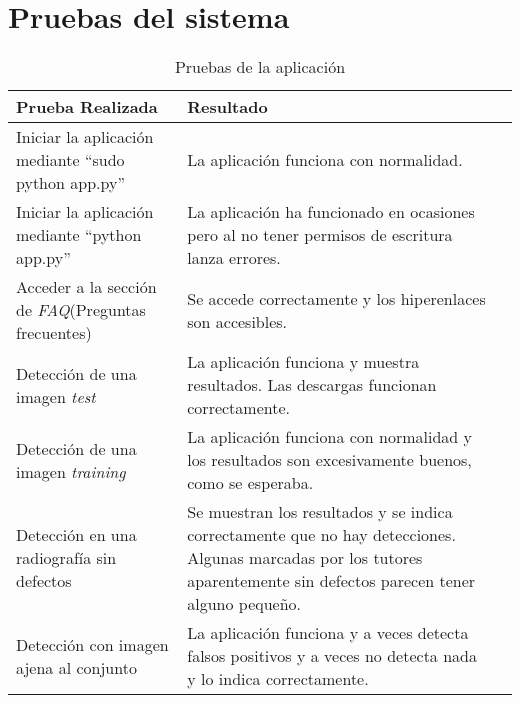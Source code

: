 \clearpage

\section{Pruebas del sistema}

\begin{table}[h]
	\begin{center}
		\begin{tabular}{>{\centering\arraybackslash}m{5cm} >{\centering\arraybackslash}m{5cm} p{9cm}}
		    \hline
			\textbf{Prueba Realizada}  & \textbf{Resultado}\\ \hline \hline
    			    Iniciar la aplicación mediante ``sudo python app.py'' & La aplicación funciona con normalidad.\\ \hline
    			    Iniciar la aplicación mediante ``python app.py'' & La aplicación ha funcionado en ocasiones pero al no tener permisos de escritura lanza errores. \\ \hline
    			    Acceder a la sección de \emph{FAQ}(Preguntas frecuentes) & Se accede correctamente y los hiperenlaces son accesibles. \\ \hline
    			    Detección de una imagen \emph{test} & La aplicación funciona y muestra resultados. Las descargas funcionan correctamente. \\ \hline
    			    Detección de una imagen \emph{training} & La aplicación funciona con normalidad y los resultados son excesivamente buenos, como se esperaba. \\ \hline
    			    Detección en una radiografía sin defectos & Se muestran los resultados y se indica correctamente que no hay detecciones. Algunas marcadas por los tutores aparentemente sin defectos parecen tener alguno pequeño. \\ \hline
    			    Detección con imagen ajena al conjunto & La aplicación funciona y a veces detecta falsos positivos y a veces no detecta nada y lo indica correctamente. \\ \hline
    			   
		\end{tabular}
		\caption{Pruebas de la aplicación}
		\label{tablapruebas1}
	\end{center}
\end{table}

